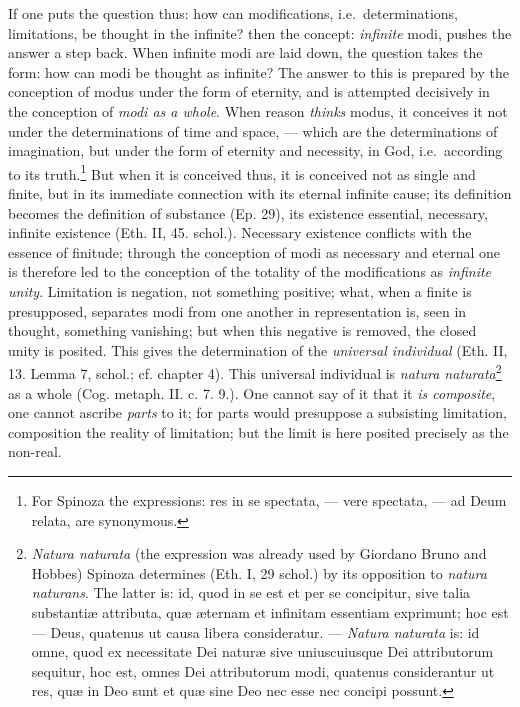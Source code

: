 \documentclass[12pt,a4paper,openany]{book}
\newcommand{\opage}[1]{\marginnote{\footnotesize\textit{[#1]}}}
\begin{document}
If one puts the question thus: how can modifications, i.e.\
determinations, limitations, be thought in the infinite? then
the concept: \emph{infinite} modi, pushes the answer a step back. When %
infinite modi are laid down, the question takes the form: how
can modi be thought as infinite? The answer to this is prepared by
the conception of modus under the form of eternity, and is attempted decisively
in the conception of \emph{modi as a whole}. When reason
\emph{thinks} modus, it conceives it not under the determinations of time and space,
--- which are the determinations of imagination, but under the form of
eternity and necessity, in God, i.e.\ according to its
truth.\footnote{For Spinoza the expressions: res in se spectata, ---
vere spectata, --- ad Deum relata, are synonymous.} But when it is
conceived thus, it is conceived not as single and finite, but in its
immediate connection with its eternal infinite cause; its definition
becomes the definition of substance (Ep. 29), its existence essential,
necessary, infinite existence (Eth. II, 45. schol.). Necessary
existence conflicts with the essence of finitude; through the conception of
modi as necessary and eternal one is therefore led to the conception of
the totality of the modifications as \emph{infinite unity}. Limitation
is negation, not something positive; what, when a finite is
presupposed, separates modi from one another in representation is, seen
in thought, something vanishing; but when this negative is removed, the
closed unity is posited. This
\opage{61}\setcounter{footnote}{0}gives the determination of the \emph{universal individual} (Eth. II, 13.
Lemma 7, schol.; cf. chapter 4). This universal individual is
\emph{natura naturata}\footnote{\emph{Natura naturata} (the expression was
already used by Giordano Bruno and Hobbes) Spinoza determines (Eth. I,
29 schol.) by its opposition to \emph{natura naturans}. The latter is: id,
quod in se est et per se concipitur, sive talia substantiæ attributa,
quæ æternam et infinitam essentiam exprimunt; hoc est --- Deus,
quatenus ut causa libera consideratur. --- \emph{Natura naturata} is:
id omne, quod ex necessitate Dei naturæ sive uniuscuiusque Dei
attributorum sequitur, hoc est, omnes Dei attributorum modi, quatenus
considerantur ut res, quæ in Deo sunt et quæ sine Deo nec esse nec
concipi possunt.} as a whole (Cog. metaph. II. c. 7. 9.). One cannot say
of it that it \emph{is composite}, one cannot ascribe \emph{parts} to it;
for parts would presuppose a subsisting limitation, composition
the reality of limitation; but the limit is here posited precisely as the
non-real.
\end{document}
